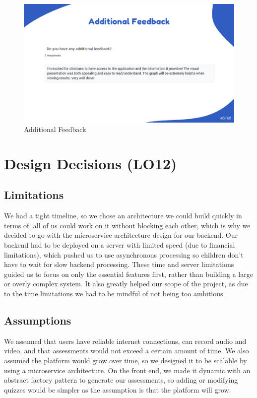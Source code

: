 \documentclass{article}
\begin{document}
\begin{figure}[H]
  \centering
  \includegraphics[width=\textwidth]{images/slide46.png}
  \caption{Additional Feedback}
  \label{fig:feedback_5}
\end{figure}

\newpage

\section{Design Decisions (LO12)}

\subsection{Limitations}
\hspace{2em}We had a tight timeline, so we chose an architecture we could build quickly in terms of, all of us could work 
on it without blocking each other, which is why we decided to go with the microservice architecture design for our backend.
Our backend had to be deployed on a server with limited speed (due to financial limitations), which pushed us to use asynchronous processing 
so children don't have to wait for slow backend processing. These time and server limitations guided us to focus on only 
the essential features first, rather than building a large or overly complex system. It also greatly helped our scope of the project, as due to the time limitations
we had to be mindful of not being too ambitious.

\subsection{Assumptions}
\hspace{2em}We assumed that users have reliable internet connections, can record audio and video, and that assessments would 
not exceed a certain amount of time. We also assumed the platform would grow over time, so we designed it to be 
scalable by using a microservice architecture. On the front end, we made it dynamic with an abstract 
factory pattern to generate our assessments, so adding or modifying quizzes would be simpler as the assumption is that the platform will grow. 
\end{document}
